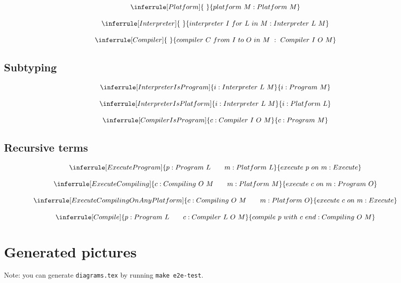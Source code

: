 \documentclass{article}
\begin{document}
\[
\inferrule[Platform]{\ }{platform\ M : Platform\ M}
\]

\[
\inferrule[Interpreter]{\ }{interpreter\ I\ for\ L\ in\ M : Interpreter\ L\ M}
\]

\[
\inferrule[Compiler]{\ }{compiler\ C\ from\ I\ to\ O\ in\ M\ :\ Compiler\ I\ O\ M}
\]

\subsection*{Subtyping}

\[
\inferrule[InterpreterIsProgram]{i : Interpreter\ L\ M}{i : Program\ M}
\]

\[
\inferrule[InterpreterIsPlatform]{i : Interpreter\ L\ M}{i : Platform\ L}
\]

\[
\inferrule[CompilerIsProgram]{c : Compiler\ I\ O\ M}{c : Program\ M}
\]

\subsection*{Recursive terms}

\[
\inferrule[ExecuteProgram]{p : Program\ L \qquad m : Platform\ L}{execute\ p\ on\ m : Execute}
\]

\[
\inferrule[ExecuteCompiling]{c : Compiling\ O\ M \qquad m : Platform\ M}{execute\ c\ on\ m : Program\ O}
\]

\[
\inferrule[ExecuteCompilingOnAnyPlatform]{c : Compiling\ O\ M \qquad m : Platform\ O}{execute\ c\ on\ m : Execute}
\]

\[
\inferrule[Compile]{p : Program\ L \qquad c : Compiler\ L\ O\ M}{compile\ p\ with\ c\ end : Compiling\ O\ M}
\]

\section{Generated pictures}

Note: you can generate \texttt{diagrams.tex} by running \texttt{make e2e-test}.


\end{document}
